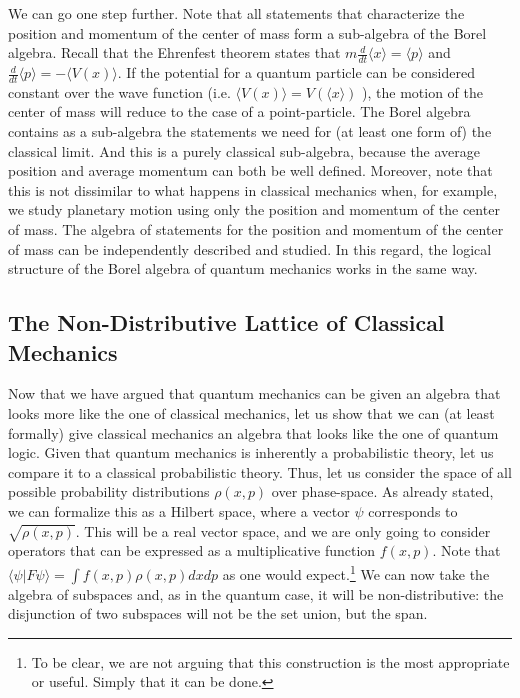 \documentclass[11pt, executivepaper]{article}
\begin{document}
We can go one step further. Note that all statements that characterize the position and momentum of the center of mass form a sub-algebra of the Borel algebra. Recall that the Ehrenfest theorem states that $m \frac{d}{dt}\langle x \rangle = \langle p \rangle$ and $ \frac{d}{dt}\langle p \rangle = - \langle V(x) \rangle$. If the potential for a quantum particle can be considered constant over the wave function (i.e. $\langle V(x) \rangle = V(\langle x \rangle)$ ), the motion of the center of mass will reduce to the case of a point-particle. The Borel algebra contains as a sub-algebra the statements we need for (at least one form of) the classical limit. And this is a purely classical sub-algebra, because the average position and average momentum can both be well defined. Moreover, note that this is not dissimilar to what happens in classical mechanics when, for example, we study planetary motion using only the position and momentum of the center of mass. The algebra of statements for the position and momentum of the center of mass can be independently described and studied. In this regard, the logical structure of the Borel algebra of quantum mechanics works in the same way.

\subsection{The Non-Distributive Lattice of Classical Mechanics}

Now that we have argued that quantum mechanics can be given an algebra that looks more like the one of classical mechanics, let us show that we can (at least formally) give classical mechanics an algebra that looks like the one of quantum logic. Given that quantum mechanics is inherently a probabilistic theory, let us compare it to a classical probabilistic theory. Thus, let us consider the space of all possible probability distributions $\rho(x,p)$ over phase-space. As already stated, we can formalize this as a Hilbert space, where a vector $\psi$ corresponds to $\sqrt{\rho(x,p)}$. This will be a real vector space, and we are only going to consider operators that can be expressed as a multiplicative function $f(x,p)$. Note that $\langle \psi | F \psi \rangle = \int f(x,p) \rho(x,p) dx dp$ as one would expect.\footnote{To be clear, we are not arguing that this construction is the most appropriate or useful. Simply that it can be done.}  We can now take the algebra of subspaces and, as in the quantum case, it will be non-distributive: the disjunction of two subspaces will not be the set union, but the span.
\end{document}
